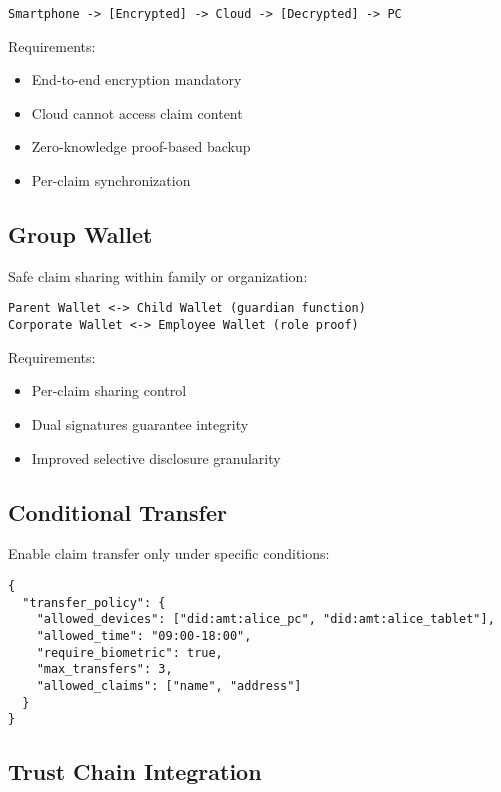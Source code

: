\begin{verbatim}
Smartphone -> [Encrypted] -> Cloud -> [Decrypted] -> PC
\end{verbatim}

Requirements:
\begin{itemize}
  \item End-to-end encryption mandatory
  \item Cloud cannot access claim content
  \item Zero-knowledge proof-based backup
  \item Per-claim synchronization
\end{itemize}

\subsection{Group Wallet}

Safe claim sharing within family or organization:

\begin{verbatim}
Parent Wallet <-> Child Wallet (guardian function)
Corporate Wallet <-> Employee Wallet (role proof)
\end{verbatim}

Requirements:
\begin{itemize}
  \item Per-claim sharing control
  \item Dual signatures guarantee integrity
  \item Improved selective disclosure granularity
\end{itemize}

\subsection{Conditional Transfer}

Enable claim transfer only under specific conditions:

\begin{verbatim}
{
  "transfer_policy": {
    "allowed_devices": ["did:amt:alice_pc", "did:amt:alice_tablet"],
    "allowed_time": "09:00-18:00",
    "require_biometric": true,
    "max_transfers": 3,
    "allowed_claims": ["name", "address"]
  }
}
\end{verbatim}

\subsection{Trust Chain Integration}

